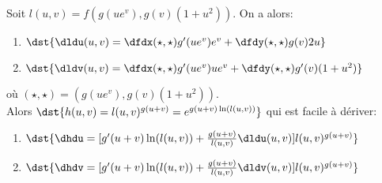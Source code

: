 \noindent Soit $l(u,v)=f(g(ue^v),g(v)(1+u^2))$. On a alors:
\begin{enumerate}
\item $\dst{\dldu(u,v) = \dfdx(\star,\star)g'(ue^v)e^v + \dfdy(\star,\star)g(v)2u}$
\item $\dst{\dldv(u,v) = \dfdx(\star,\star)g'(ue^v)ue^v+\dfdy(\star,\star)g'(v)(1+u^2)}$
\end{enumerate}
o\`{u} $(\star,\star)=(g(ue^v),g(v)(1+u^2))$.\\

\noindent Alors $\dst{h(u,v)=l(u,v)^{g(u+v)} = e^{g(u+v)\ln(l(u,v))}}$ qui est facile à dériver:

\begin{enumerate}
\item $\dst{\dhdu = [g'(u+v)\ln(l(u,v))+\frac{g(u+v)}{l(u,v)}\dldu(u,v)] l(u,v)^{g(u+v)}}$
\item $\dst{\dhdv = [g'(u+v)\ln(l(u,v))+\frac{g(u+v)}{l(u,v)}\dldv(u,v)] l(u,v)^{g(u+v)}}$
\end{enumerate}



